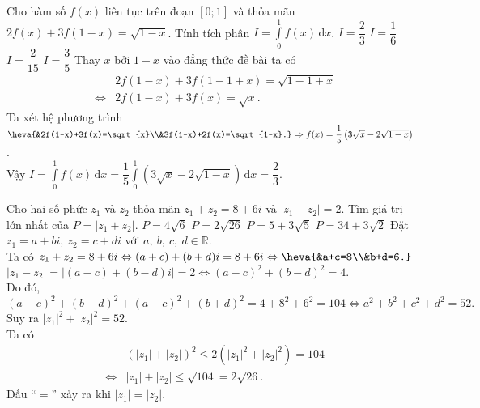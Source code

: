 \begin{ex}%
	Cho hàm số $f(x)$ liên tục trên đoạn $[0;1]$ và thỏa mãn $2f(x)+3f(1-x)=\sqrt{1-x}$. Tính tích phân $I=\displaystyle\int\limits_0^1 f(x)\mathrm{\,d}x$.
	\choice
	{\True $I=\dfrac{2}{3}$}
	{$I=\dfrac{1}{6}$}
	{$I=\dfrac{2}{15}$}
	{$I=\dfrac{3}{5}$}
	\loigiai
	{
		Thay $x$ bởi $1-x$ vào đẳng thức đề bài ta có
		\begin{eqnarray*}
			& & 2f(1-x)+3f(1-1+x)=\sqrt{1-1+x}\\
			& \Leftrightarrow & 2f(1-x)+3f(x)=\sqrt{x}.
		\end{eqnarray*}
		Ta xét hệ phương trình $\heva{&2f(1-x)+3f(x)=\sqrt{x}\\&3f(1-x)+2f(x)=\sqrt{1-x}.}\Rightarrow f(x)=\dfrac{1}{5}\left(3\sqrt{x}-2\sqrt{1-x}\right)$.\\
		Vậy $I=\displaystyle\int\limits_0^1 f(x)\mathrm{\,d}x=\dfrac{1}{5}\displaystyle\int\limits_0^1 \left(3\sqrt{x}-2\sqrt{1-x}\right)\mathrm{\,d}x=\dfrac{2}{3}$.
	}
\end{ex}

\begin{ex}%
	Cho hai số phức $z_1$ và $z_2$ thỏa mãn $z_1+z_2=8+6i$ và $|z_1-z_2|=2$. Tìm giá trị lớn nhất của $P=|z_1+z_2|$.
	\choice
	{$P=4\sqrt{6}$}
	{\True $P=2\sqrt{26}$}
	{$P=5+3\sqrt{5}$}
	{$P=34+3\sqrt{2}$}
	\loigiai
	{
		Đặt $z_1=a+bi,~z_2=c+di$ với $a,~b,~c,~d\in\mathbb{R}$.\\
		Ta có $z_1+z_2=8+6i\Leftrightarrow (a+c)+(b+d)i=8+6i\Leftrightarrow\heva{&a+c=8\\&b+d=6.}$\\
		$\left|z_1-z_2\right|=\left|(a-c)+(b-d)i\right|=2\Leftrightarrow (a-c)^2+(b-d)^2=4.$\\
		Do đó, $(a-c)^2+(b-d)^2+(a+c)^2+(b+d)^2=4+8^2+6^2=104\Leftrightarrow a^2+b^2+c^2+d^2=52.$\\
		Suy ra $|z_1|^2+|z_2|^2=52$.\\
		Ta có \vspace{-3ex}
		\begin{eqnarray*}
			& &\left(|z_1|+|z_2|\right)^2\le2\left(|z_1|^2+|z_2|^2\right)=104\\
			& \Leftrightarrow & |z_1|+|z_2|\le\sqrt{104}=2\sqrt{26}.
		\end{eqnarray*}	
		Dấu ``$=$'' xảy ra khi $|z_1|=|z_2|$.
	}
\end{ex}


